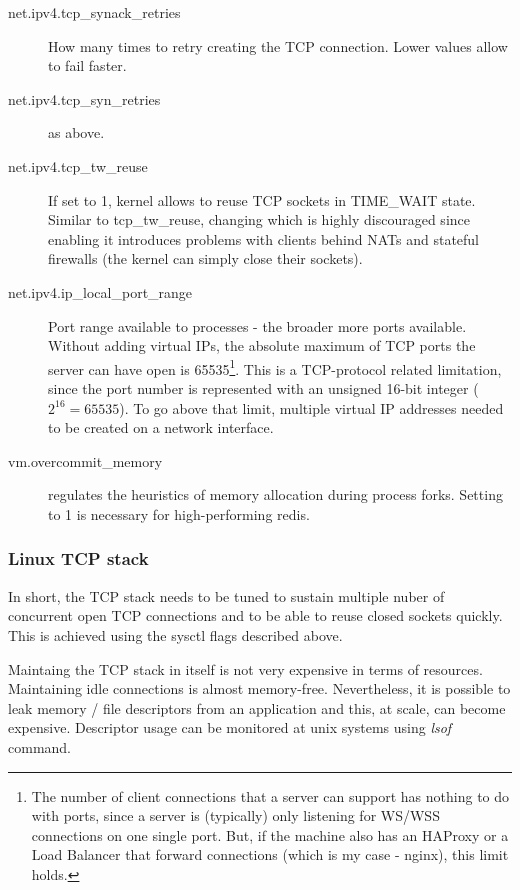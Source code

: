 \documentclass{uvamscse}
\begin{document}
\begin{description}
  \item[net.ipv4.tcp\_synack\_retries] How many times to retry creating the TCP connection. Lower values allow to fail faster.
  \item[net.ipv4.tcp\_syn\_retries] as above.
  \item[net.ipv4.tcp\_tw\_reuse] If set to 1, kernel allows to reuse TCP sockets in TIME\_WAIT state. Similar to tcp\_tw\_reuse, changing which is highly discouraged since enabling it introduces problems with clients behind NATs and stateful firewalls (the kernel can simply close their sockets).
  \item[net.ipv4.ip\_local\_port\_range] Port range available to processes - the broader more ports available. Without adding virtual IPs, the absolute maximum of TCP ports the server can have open is 65535\footnote{The number of client connections that a server can support has nothing to do with ports, since a server is (typically) only listening for WS/WSS connections on one single port. But, if the machine also has an HAProxy or a Load Balancer that forward connections (which is my case - nginx), this limit holds.}. This is a TCP-protocol related limitation, since the port number is represented with an unsigned 16-bit integer ($2^{16}=65535$). To go above that limit, multiple virtual IP addresses needed to be created on a network interface.
  \item[vm.overcommit\_memory] regulates the heuristics of memory allocation during process forks. Setting to 1 is necessary for high-performing redis.
\end{description}

\subsubsection{Linux TCP stack}

In short, the TCP stack needs to be tuned to sustain multiple nuber of concurrent open TCP connections and to be able to reuse closed sockets quickly. This is achieved using the sysctl flags described above.

Maintaing the TCP stack in itself is not very expensive in terms of resources. Maintaining idle connections is almost memory-free. Nevertheless, it is possible to leak memory / file descriptors from an application and this, at scale, can become expensive. Descriptor usage can be monitored at unix systems using \textit{lsof} command.
\end{document}
